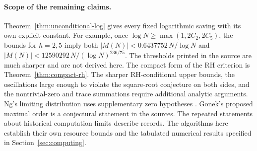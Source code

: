 \paragraph{Scope of the remaining claims.}
Theorem~\ref{thm:unconditional-log} gives every fixed logarithmic saving with its own explicit constant. For example, once $\log N\ge\max(1,2C_2,2C_5)$, the bounds for $h=2,5$ imply both $|M(N)|<0.6437752\,N/\log N$ and $|M(N)|<12590292\,N/(\log N)^{236/75}$. The thresholds printed in the source are much sharper and are not derived here. The compact form of the RH criterion is Theorem~\ref{thm:compact-rh}. The sharper RH-conditional upper bounds, the oscillations large enough to violate the square-root conjecture on both sides, and the nontrivial-zero and trace summations require additional analytic arguments. Ng's limiting distribution uses supplementary zero hypotheses \cite{ng}. Gonek's proposed maximal order is a conjectural statement in the sources. The repeated statements about historical computation limits describe records. The algorithms here establish their own resource bounds and the tabulated numerical results specified in Section~\ref{sec:computing}.
